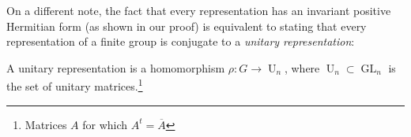 






On a different note, the fact that every representation has an invariant positive Hermitian form (as shown in our proof) is equivalent to stating that every representation of a finite group is conjugate to a \emph{unitary representation}:

\begin{definition}
A unitary representation is a homomorphism $\rho: G \to \operatorname{U}_n$, where $\operatorname{U}_n \subset \operatorname{GL}_n$ is the set of unitary matrices.\footnote{Matrices $A$ for which $A^t = \overline{A}$} 
\end{definition}

